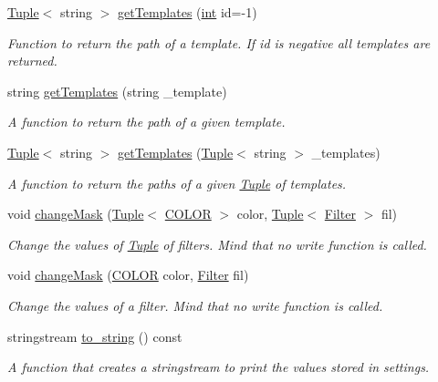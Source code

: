 \begin{DoxyCompactItemize}
\mbox{\hyperlink{class_tuple}{Tuple}}$<$ string $>$ \mbox{\hyperlink{class_settings_af68cb84ba3c8d21e004661fee7c0efe7}{get\+Templates}} (\mbox{\hyperlink{draw_8hh_aa620a13339ac3a1177c86edc549fda9b}{int}} id=-\/1)
\begin{DoxyCompactList}\small\item\em Function to return the path of a template. If id is negative all templates are returned. \end{DoxyCompactList}\item 
string \mbox{\hyperlink{class_settings_aa77f9d559fb0f14d551c4ee8a742e6b0}{get\+Templates}} (string \+\_\+template)
\begin{DoxyCompactList}\small\item\em A function to return the path of a given template. \end{DoxyCompactList}\item 
\mbox{\hyperlink{class_tuple}{Tuple}}$<$ string $>$ \mbox{\hyperlink{class_settings_a2fe58de6135c30ec02bccfc20cc15fe3}{get\+Templates}} (\mbox{\hyperlink{class_tuple}{Tuple}}$<$ string $>$ \+\_\+templates)
\begin{DoxyCompactList}\small\item\em A function to return the paths of a given \mbox{\hyperlink{class_tuple}{Tuple}} of templates. \end{DoxyCompactList}\item 
void \mbox{\hyperlink{class_settings_ad0d55c536a84990b048463b924c7d88e}{change\+Mask}} (\mbox{\hyperlink{class_tuple}{Tuple}}$<$ \mbox{\hyperlink{class_settings_a30d85f2e06a54ae9bc8da2d01037658f}{C\+O\+L\+OR}} $>$ color, \mbox{\hyperlink{class_tuple}{Tuple}}$<$ \mbox{\hyperlink{class_filter}{Filter}} $>$ fil)
\begin{DoxyCompactList}\small\item\em Change the values of \mbox{\hyperlink{class_tuple}{Tuple}} of filters. Mind that no write function is called. \end{DoxyCompactList}\item 
void \mbox{\hyperlink{class_settings_ad00eb6c82b7e6af5afbb8d881c50dea8}{change\+Mask}} (\mbox{\hyperlink{class_settings_a30d85f2e06a54ae9bc8da2d01037658f}{C\+O\+L\+OR}} color, \mbox{\hyperlink{class_filter}{Filter}} fil)
\begin{DoxyCompactList}\small\item\em Change the values of a filter. Mind that no write function is called. \end{DoxyCompactList}\item 
stringstream \mbox{\hyperlink{class_settings_a20696223267b07d77408e38e87388274}{to\+\_\+string}} () const
\begin{DoxyCompactList}\small\item\em A function that creates a stringstream to print the values stored in settings. \end{DoxyCompactList}\end{DoxyCompactItemize}
